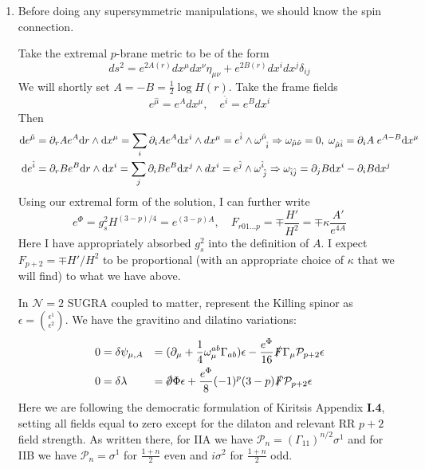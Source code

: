 \documentclass[11pt, class=article, crop=false]{standalone}
\begin{document}
\begin{enumerate}
	\item Before doing any supersymmetric manipulations, we should know the spin connection.
	
	Take the extremal $p$-brane metric to be of the form
	\[
		ds^2 = e^{2 A(r)} dx^\mu dx^\nu \eta_{\mu \nu} + e^{2 B(r)} dx^i dx^j \delta_{ij}
	\]
	We will shortly set $A = - B = \frac12 \log H(r)$. Take the frame fields
	\[
		e^{\hat \mu} = e^A dx^\mu, \quad e^{\hat i} = e^B dx^{i}
	\]
	Then
	\[
		\begin{aligned}
			\mathrm{d} e^{\hat \mu} &= \partial_r A e^{A} \mathrm{d} r \wedge \mathrm{d} x^\mu = \sum_i \partial_i A e^A \mathrm{d} x^i \wedge dx^\mu = e^{\hat i} \wedge \omega^{\hat \mu}_{\;\; \hat i} \Rightarrow  \omega_{\hat \mu \hat \nu} = 0, \; \omega_{\hat \mu \hat i} = \partial_i A \; e^{A - B} \mathrm{d} x^\mu \\
			\mathrm{d} e^{\hat i} &= \partial_r B e^{B} \mathrm{d} r \wedge \mathrm{d} x^i = \sum_j \partial_i B e^B \mathrm{d} x^j \wedge dx^i = e^{\hat j} \wedge \omega^{\hat i}_{\; \hat j}
			\Rightarrow \omega_{\hat i \hat j} = \partial_j B \mathrm{d} x^i - \partial_i B \mathrm{d} x^j \\
		\end{aligned}
	\]
	Using our extremal form of the solution, I can further write
	\[
		e^{\Phi} = g_s^2 H^{(3-p)/4} = e^{(3-p) A}, \quad F_{r01\dots p} = \mp \frac{H'}{H^2} = \mp \kappa \frac{A'}{e^{4A}}
	\]
	Here I have appropriately absorbed $g_s^2$ into the definition of $A$. I expect $F_{p+2} = \mp H'/H^2$ to be proportional (with an appropriate choice of $\kappa$ that we will find) to what we have above.
	
	
	In $\mathcal N = 2$ SUGRA coupled to matter, represent the Killing spinor as $\epsilon = {\epsilon^1 \choose \epsilon^2}$. We have the gravitino and dilatino variations:
	\[
	\begin{aligned}
		0 &=
		 \delta \psi_{\mu, A} & = & \; (\d_\mu + \frac14 \omega_{\mu}^{ab} \Gamma_{ab}) \epsilon - \frac{e^\Phi}{16} \slashed{F} \Gamma_\mu \mathcal P_{p+2} \epsilon \\
		0 &= \delta \lambda & =& \; \slashed{\d} \Phi \epsilon  + \frac{e^{\Phi}}{8} (-1)^p (3-p) \slashed F \mathcal P_{p+2} \epsilon
	\end{aligned}
	\]
	Here we are following the democratic formulation of Kiritsis Appendix \textbf{I.4}, setting all fields equal to zero except for the dilaton and relevant RR $p+2$ field strength. As written there, for IIA we have $\mathcal P_n = (\Gamma_11)^{n/2} \sigma^1$ and for IIB we have $\mathcal P_n = \sigma^1$ for $\frac{1+n}{2}$ even and $i \sigma^2$ for $\frac{1+n}{2}$ odd. 
	

\end{enumerate}
\end{document}
